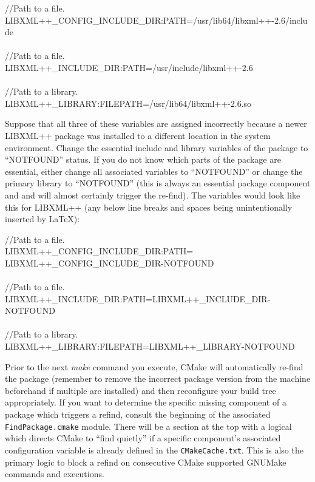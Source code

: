 \documentclass[12pt,letterpaper]{article}
\begin{document}
\begin{shaded}
\noindent//Path to a file.\\
LIBXML++\_CONFIG\_INCLUDE\_DIR:PATH=/usr/lib64/libxml++-2.6/include\\
\\
//Path to a file.\\
LIBXML++\_INCLUDE\_DIR:PATH=/usr/include/libxml++-2.6\\
\\
//Path to a library.\\
LIBXML++\_LIBRARY:FILEPATH=/usr/lib64/libxml++-2.6.so\\
\end{shaded}

Suppose that all three of these variables are assigned incorrectly because a newer LIBXML++ package was installed to a different location in the system environment.  Change the essential include and library variables of the package to ``NOTFOUND'' status.  If you do not know which parts of the package are essential, either change all associated variables to ``NOTFOUND'' or change the primary library to ``NOTFOUND'' (this is always an essential package component and and will almost certainly trigger the re-find).  The variables would look like this for LIBXML++ (any below line breaks and spaces being unintentionally inserted by \LaTeX):

\begin{shaded}
\noindent//Path to a file.\\
LIBXML++\_CONFIG\_INCLUDE\_DIR:PATH= LIBXML++\_CONFIG\_INCLUDE\_DIR-NOTFOUND\\
\\
//Path to a file.\\
LIBXML++\_INCLUDE\_DIR:PATH=LIBXML++\_INCLUDE\_DIR-NOTFOUND\\
\\
//Path to a library.\\
LIBXML++\_LIBRARY:FILEPATH=LIBXML++\_LIBRARY-NOTFOUND\\
\end{shaded}

Prior to the next \emph{make} command you execute, CMake will automatically re-find the package (remember to remove the incorrect package version from the machine beforehand if multiple are installed) and then reconfigure your build tree appropriately.  If you want to determine the specific missing component of a package which triggers a refind, consult the beginning of the associated \verb|FindPackage.cmake| module.  There will be a section at the top with a logical which directs CMake to ``find quietly'' if a specific component's associated configuration variable is already defined in the \verb|CMakeCache.txt|.  This is also the primary logic to block a refind on consecutive CMake supported GNUMake commands and executions.
\end{document}
